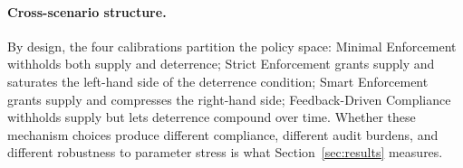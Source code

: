 \paragraph{Cross-scenario structure.}

By design, the four calibrations partition the policy space: Minimal Enforcement withholds both supply and deterrence; Strict Enforcement grants supply and saturates the left-hand side of the deterrence condition; Smart Enforcement grants supply and compresses the right-hand side; Feedback-Driven Compliance withholds supply but lets deterrence compound over time. Whether these mechanism choices produce different compliance, different audit burdens, and different robustness to parameter stress is what Section~\ref{sec:results} measures.
